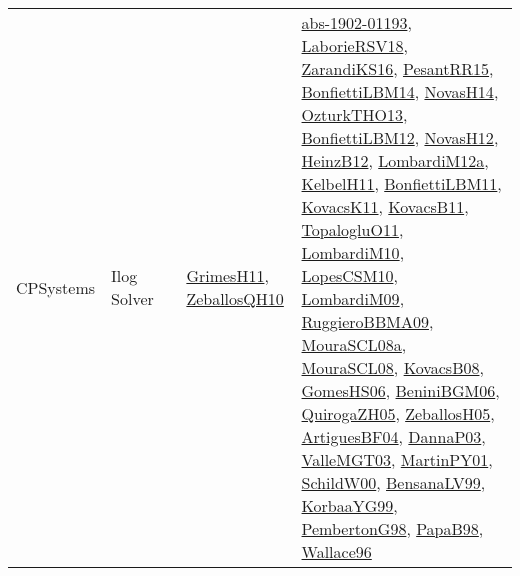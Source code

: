{\begin{longtable}{lp{3cm}>{\raggedright}p{6cm}>{\raggedright}p{6cm}p{8cm}}
CPSystems & Ilog Solver &  & \href{papers/GrimesH11.pdf}{GrimesH11}\cite{GrimesH11}, \href{articles/ZeballosQH10.pdf}{ZeballosQH10}\cite{ZeballosQH10} & \href{articles/abs-1902-01193.pdf}{abs-1902-01193}\cite{abs-1902-01193}, \href{articles/LaborieRSV18.pdf}{LaborieRSV18}\cite{LaborieRSV18}, \href{articles/ZarandiKS16.pdf}{ZarandiKS16}\cite{ZarandiKS16}, \href{papers/PesantRR15.pdf}{PesantRR15}\cite{PesantRR15}, \href{articles/BonfiettiLBM14.pdf}{BonfiettiLBM14}\cite{BonfiettiLBM14}, \href{articles/NovasH14.pdf}{NovasH14}\cite{NovasH14}, \href{articles/OzturkTHO13.pdf}{OzturkTHO13}\cite{OzturkTHO13}, \href{papers/BonfiettiLBM12.pdf}{BonfiettiLBM12}\cite{BonfiettiLBM12}, \href{articles/NovasH12.pdf}{NovasH12}\cite{NovasH12}, \href{papers/HeinzB12.pdf}{HeinzB12}\cite{HeinzB12}, \href{articles/LombardiM12a.pdf}{LombardiM12a}\cite{LombardiM12a}, \href{articles/KelbelH11.pdf}{KelbelH11}\cite{KelbelH11}, \href{papers/BonfiettiLBM11.pdf}{BonfiettiLBM11}\cite{BonfiettiLBM11}, \href{articles/KovacsK11.pdf}{KovacsK11}\cite{KovacsK11}, \href{articles/KovacsB11.pdf}{KovacsB11}\cite{KovacsB11}, \href{articles/TopalogluO11.pdf}{TopalogluO11}\cite{TopalogluO11}, \href{papers/LombardiM10.pdf}{LombardiM10}\cite{LombardiM10}, \href{articles/LopesCSM10.pdf}{LopesCSM10}\cite{LopesCSM10}, \href{papers/LombardiM09.pdf}{LombardiM09}\cite{LombardiM09}, \href{articles/RuggieroBBMA09.pdf}{RuggieroBBMA09}\cite{RuggieroBBMA09}, \href{papers/MouraSCL08a.pdf}{MouraSCL08a}\cite{MouraSCL08a}, \href{papers/MouraSCL08.pdf}{MouraSCL08}\cite{MouraSCL08}, \href{articles/KovacsB08.pdf}{KovacsB08}\cite{KovacsB08}, \href{papers/GomesHS06.pdf}{GomesHS06}\cite{GomesHS06}, \href{papers/BeniniBGM06.pdf}{BeniniBGM06}\cite{BeniniBGM06}, \href{papers/QuirogaZH05.pdf}{QuirogaZH05}\cite{QuirogaZH05}, \href{articles/ZeballosH05.pdf}{ZeballosH05}\cite{ZeballosH05}, \href{papers/ArtiguesBF04.pdf}{ArtiguesBF04}\cite{ArtiguesBF04}, \href{papers/DannaP03.pdf}{DannaP03}\cite{DannaP03}, \href{papers/ValleMGT03.pdf}{ValleMGT03}\cite{ValleMGT03}, \href{articles/MartinPY01.pdf}{MartinPY01}\cite{MartinPY01}, \href{articles/SchildW00.pdf}{SchildW00}\cite{SchildW00}, \href{articles/BensanaLV99.pdf}{BensanaLV99}\cite{BensanaLV99}, \href{papers/KorbaaYG99.pdf}{KorbaaYG99}\cite{KorbaaYG99}, \href{papers/PembertonG98.pdf}{PembertonG98}\cite{PembertonG98}, \href{articles/PapaB98.pdf}{PapaB98}\cite{PapaB98}, \href{articles/Wallace96.pdf}{Wallace96}\cite{Wallace96}\\

\end{longtable}}
